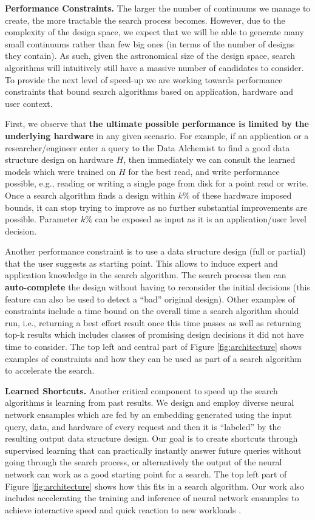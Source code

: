 \documentclass[11pt]{article}
\begin{document}
\textbf{Performance Constraints.} 
The larger the number of continuums we manage to create, the more tractable the search process becomes. However, due to the complexity of the design space, we expect that we will be able to generate many small continuums rather than few big ones (in terms of the number of designs they contain). As such, given the astronomical size of the design space, search algorithms will intuitively still have a massive number of candidates to consider. To provide the next level of speed-up we are working towards performance constraints that  bound search algorithms based on application, hardware and user context. 

First, we observe that \textbf{the ultimate possible performance is limited by the underlying hardware} in any given scenario. For example, if an application or a researcher/engineer enter a query to the Data Alchemist to find a good data structure design on hardware $H$, then immediately we can consult the learned models which were trained on $H$ for the best read, and write performance possible, e.g., reading or writing a single page from disk for a point read or write. Once a search algorithm finds a design within $k\%$ of these hardware imposed bounds, it can stop trying to improve as no further substantial improvements are possible. Parameter $k\%$ can be exposed as input as it is an application/user level decision. 

Another performance constraint is to use a data structure design (full or partial) that the user suggests as starting point. This allows to induce expert and application knowledge in the search algorithm. The search process then can \textbf{auto-complete} the design without having to reconsider the initial decisions (this feature can also be used to detect a ``bad'' original design). Other examples of constraints include a time bound on the overall time a search algorithm should run, i.e., returning a best effort result once this time passes as well as returning top-k results which includes classes of promising design decisions it did not have time to consider. The top left and central part of Figure \ref{fig:architecture} shows examples of constraints and how they can be used as part of a search algorithm to accelerate the search. 
 

\textbf{Learned Shortcuts.}
Another critical component to speed up the search algorithms is learning from past results. We design and employ diverse neural network ensamples which are fed by an embedding generated using the input query, data, and hardware of every request and then it is ``labeled'' by the resulting output data structure design. Our goal is to create shortcuts through supervised learning that can practically instantly answer future queries without going through the search process, or alternatively the output of the neural network can work as a good starting point for a search. The top left part of Figure \ref{fig:architecture} shows how this fits in a search algorithm. Our work also includes accelerating the training and inference of neural network ensamples to achieve interactive speed and quick reaction to new workloads \cite{Wasay2018}.
\end{document}

